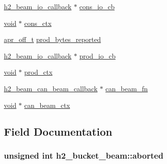 \begin{DoxyCompactItemize}
\item 
\hyperlink{h2__bucket__beam_8h_ae2b209907927e16b196e2005efccb268}{h2\+\_\+beam\+\_\+io\+\_\+callback} $\ast$ \hyperlink{structh2__bucket__beam_ac2cf8e4adfc170ed3601da1d38b53ff6}{cons\+\_\+io\+\_\+cb}
\item 
\hyperlink{group__MOD__ISAPI_gacd6cdbf73df3d9eed42fa493d9b621a6}{void} $\ast$ \hyperlink{structh2__bucket__beam_a1a25d5a9e6c09d477aab626691aea573}{cons\+\_\+ctx}
\item 
\hyperlink{group__apr__platform_ga6938af9075cec15c88299109381aa984}{apr\+\_\+off\+\_\+t} \hyperlink{structh2__bucket__beam_a8632e8c29cd4fd23d2c727417bb49c6a}{prod\+\_\+bytes\+\_\+reported}
\item 
\hyperlink{h2__bucket__beam_8h_ae2b209907927e16b196e2005efccb268}{h2\+\_\+beam\+\_\+io\+\_\+callback} $\ast$ \hyperlink{structh2__bucket__beam_a81c184200177a5ce1b19ef6e9060b257}{prod\+\_\+io\+\_\+cb}
\item 
\hyperlink{group__MOD__ISAPI_gacd6cdbf73df3d9eed42fa493d9b621a6}{void} $\ast$ \hyperlink{structh2__bucket__beam_a4dd611ecddb160e368d87b4aa8ed83e8}{prod\+\_\+ctx}
\item 
\hyperlink{h2__bucket__beam_8h_a402762f3cf9aa71a1e162cffb44374ba}{h2\+\_\+beam\+\_\+can\+\_\+beam\+\_\+callback} $\ast$ \hyperlink{structh2__bucket__beam_ae95b9e00f8fc9636ccd4d2eac3927b5d}{can\+\_\+beam\+\_\+fn}
\item 
\hyperlink{group__MOD__ISAPI_gacd6cdbf73df3d9eed42fa493d9b621a6}{void} $\ast$ \hyperlink{structh2__bucket__beam_a7f7bbc1b2d1835a5d74444e010635adb}{can\+\_\+beam\+\_\+ctx}
\end{DoxyCompactItemize}


\subsection{Field Documentation}
\subsubsection[{\texorpdfstring{aborted}{aborted}}]{\setlength{\rightskip}{0pt plus 5cm}unsigned {\bf int} h2\+\_\+bucket\+\_\+beam\+::aborted}\hypertarget{structh2__bucket__beam_ab94d4cbd58d09447fca78872d9a965ae}{}\label{structh2__bucket__beam_ab94d4cbd58d09447fca78872d9a965ae}
